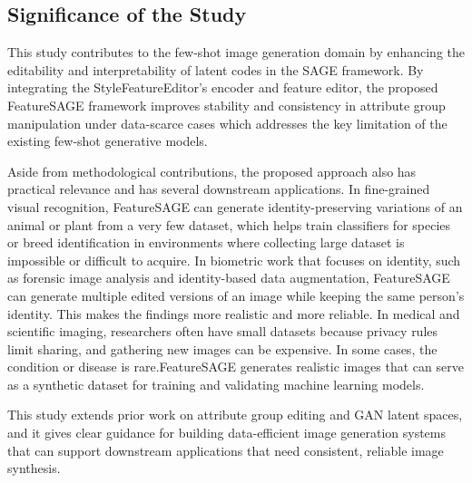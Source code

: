 \subsection{Significance of the Study}


This study contributes to the few-shot image generation domain by enhancing the editability and interpretability 
of latent codes in the SAGE framework. By integrating the StyleFeatureEditor's encoder and feature editor, the 
proposed FeatureSAGE framework improves stability and consistency in attribute group manipulation under 
data-scarce cases which addresses the key limitation of the existing few-shot generative models. 

Aside from methodological contributions, the proposed approach also has practical relevance and has several 
downstream applications. In fine-grained visual recognition, FeatureSAGE can generate identity-preserving 
variations of an animal or plant from a very few dataset, which helps train classifiers for species or breed 
identification in environments where collecting large dataset is impossible or difficult to acquire. In biometric 
work that focuses on identity, such as forensic image analysis and identity-based data augmentation, FeatureSAGE 
can generate multiple edited versions of an image while keeping the same person's identity. This makes the findings 
more realistic and more reliable. In medical and scientific imaging, researchers often have small datasets because 
privacy rules limit sharing, and gathering new images can be expensive. In some cases, the condition or disease is 
rare.FeatureSAGE generates realistic images that can serve as a synthetic dataset for training and validating 
machine learning models. 

This study extends prior work on attribute group editing and GAN latent spaces, and it gives clear guidance for 
building data-efficient image generation systems that can support downstream applications that need consistent, 
reliable image synthesis.